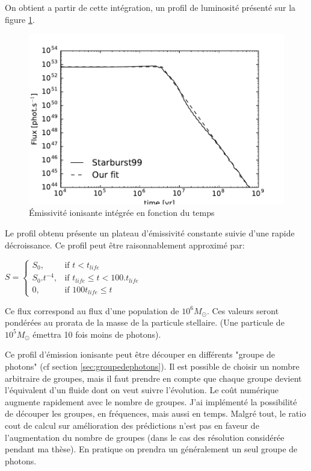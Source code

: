 On obtient a partir de cette intégration, un profil de luminosité présenté sur la figure \ref{fig:flux}.

\begin{figure}[htbp]
        \includegraphics[width=.95\linewidth]{img/03/flux.pdf} 
        \caption{Émissivité ionisante intégrée en fonction du temps}
 		\label{fig:flux}
\end{figure}

Le profil obtenu présente un plateau d'émissivité constante suivie d'une rapide décroissance.
Ce profil peut être raisonnablement approximé par:

$
    S = 
\begin{cases}
    S_0 ,         & \text{if } t < t_{life}\\
    S_0.t^{-4},   & \text{if } t_{life} \leq t < 100.t_{life} \\
    0,   & \text{if } 100t_{life} \leq t
\end{cases}
$

Ce flux correspond au flux d'une population de $10^6M_\odot$.
Ces valeurs seront pondérées au prorata de la masse de la particule stellaire. (Une particule de $10^5M_\odot$ émettra 10 fois moins de photons).


Ce profil d’émission ionisante peut être découper en différents "groupe de photons" (cf section \ref{sec:groupedephotons}).
Il est possible de choisir un nombre arbitraire de groupes, mais il faut prendre en compte que chaque groupe devient l'équivalent d'un fluide dont on veut suivre l'évolution.
Le coût numérique augmente rapidement avec le nombre de groupes. 
J'ai implémenté la possibilité de découper les groupes, en fréquences, mais aussi en temps.
Malgré tout, le ratio cout de calcul sur amélioration des prédictions n'est pas en faveur de l'augmentation du nombre de groupes (dans le cas des résolution considérée pendant ma thèse).
En pratique on prendra un généralement un seul groupe de photons.

